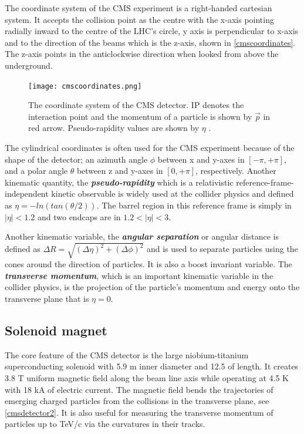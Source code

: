The coordinate system of the CMS experiment is a right-handed cartesian system. It accepts the collision point as the centre with the x-axis pointing radially inward to the centre of the LHC's circle, y axis is perpendicular to x-axis and to the direction of the beams which is the z-axis, shown in \autoref{cmscoordinates}. The z-axis points in the anticlockwise direction when looked from above the underground. 

\begin{figure}[ht]
	\centering
	\texttt{[image: cmscoordinates.png]}
	\vspace{2mm}
	\caption[The coordinate system of the CMS detector. IP denotes the interaction point and the momentum of a particle is shown by $\vec{p}$ in red arrow. Pseudo-rapidity values are shown by $\eta$.]{The coordinate system of the CMS detector. IP denotes the interaction point and the momentum of a particle is shown by $\vec{p}$ in red arrow. Pseudo-rapidity values are shown by $\eta$ \cite{cmscoordinates}.}
	\label{cmscoordinates}
\end{figure}

The cylindrical coordinates is often used for the CMS experiment because of the shape of the detector; an azimuth angle $\phi$ between x and y-axes in $\left[-\pi,+\pi\right]$, and a polar angle $\theta$ between z and y-axes in $\left[0,+\pi\right]$, respectively. Another kinematic quantity, the \textbf{\emph{pseudo-rapidity}} which is a relativistic reference-frame-independent kinetic observable is widely used at the collider physics and defined as $\eta = -ln\left(tan\left(\theta/2\right)\right)$. The barrel region in this reference frame is simply in $|\eta|<1.2$ and two endcaps are in $1.2<|\eta|<3$.

Another kinematic variable, the \textbf{\emph{angular separation}} or angular distance is defined as $\Delta R = \sqrt{\left(\Delta\eta\right)^2 + \left(\Delta\phi\right)^2}$ and is used to separate particles using the cones around the direction of particles. It is also a boost invariant variable. The \textbf{\emph{transverse momentum}}, which is an important kinematic variable in the collider physics, is the projection of the particle's momentum and energy onto the transverse plane that is $\eta = 0$.

\subsection{Solenoid magnet}

The core feature of the CMS detector is the large niobium-titanium superconducting solenoid with 5.9 m inner diameter and 12.5 of length. It creates 3.8 T uniform magnetic field along the beam line axis while operating at 4.5 K with 18 kA of electric current. The magnetic field bends the trajectories of emerging charged particles from the collisions in the transverse plane, see \autoref{cmsdetector2}. It is also useful for measuring the transverse momentum of particles up to TeV/c via the curvatures in their tracks.

